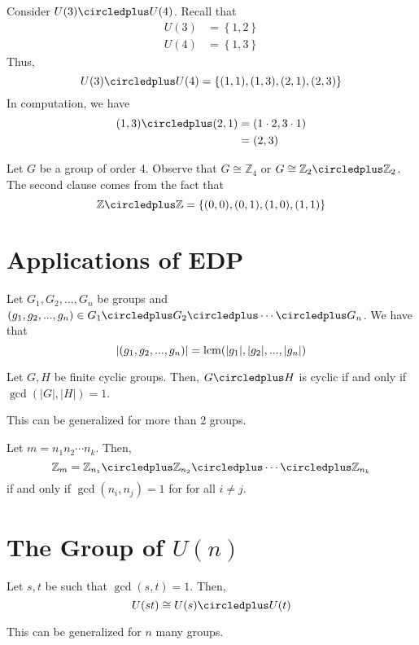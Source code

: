 \begin{nexample}
    Consider \(U(3) \circledplus U(4)\). Recall that
    \[
    \begin{aligned}
        U(3) &= \left\{1, 2\right\} \\
        U(4) &= \left\{1, 3\right\}
    \end{aligned}
    \]
    Thus, 
    \[
        U(3) \circledplus U(4) = \left\{(1, 1), (1, 3), (2, 1), (2, 3)\right\}
    \]
    In computation, we have
    \[
    \begin{aligned}
        (1, 3) \circledplus (2, 1) &= (1 \cdot 2, 3 \cdot 1) \\
                                   &= (2, 3)
    \end{aligned}
    \]
\end{nexample}

\begin{nexample}
    Let \(G\) be a group of order 4. Observe that \(G \cong \mathbb{Z}_4\) or \(G \cong \mathbb{Z}_2 \circledplus \mathbb{Z}_2\). The second clause comes from the fact that
    \[
        \mathbb{Z} \circledplus \mathbb{Z} = \left\{(0, 0), (0, 1), (1, 0), (1, 1)\right\}
    \]
\end{nexample}

\section{Applications of EDP}

\begin{theorem}
    Let \(G_1, G_2, ..., G_n\) be groups and \((g_1, g_2, ..., g_n) \in G_1 \circledplus G_2 \circledplus \cdots \circledplus G_n\). We have that
    \[
        |(g_1, g_2, ..., g_n)| = \operatorname{lcm}(|g_1|, |g_2|, ..., |g_n|)
    \]
\end{theorem}

\begin{theorem}
    Let \(G, H\) be finite cyclic groups. Then, \(G \circledplus H\) is cyclic if and only if \(\gcd(|G|, |H|) = 1\).
\end{theorem}

\begin{corollary}
    This can be generalized for more than 2 groups.
\end{corollary}

\begin{corollary}
    Let \(m = n_1 n_2 \cdots n_k\). Then,
    \[
        \mathbb{Z}_m = \mathbb{Z}_{n_1} \circledplus \mathbb{Z}_{n_2} \circledplus \cdots \circledplus \mathbb{Z}_{n_k}
    \]
    if and only if \(\gcd(n_i, n_j) = 1\) for for all \(i \neq j\).
\end{corollary}

\section{The Group of \(U(n)\)}

\begin{theorem}
    Let \(s, t\) be such that \(\gcd(s, t) = 1\). Then,
    \[
        U(st) \cong U(s) \circledplus U(t)
    \]
\end{theorem}

\begin{corollary}
    This can be generalized for \(n\) many groups.
\end{corollary}
